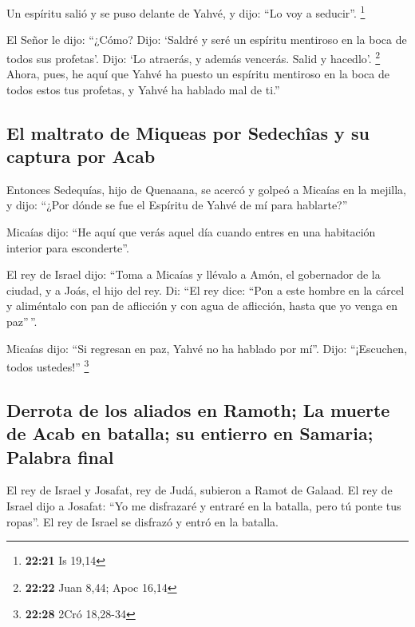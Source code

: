 \begin{paracol}{2}
 Un espíritu salió y se puso delante de Yahvé, y dijo:
``Lo voy a seducir''. \footnote{\textbf{22:21} Is 19,14}

 El Señor le dijo: ``¿Cómo? Dijo: `Saldré y seré un
espíritu mentiroso en la boca de todos sus profetas'. Dijo: `Lo
atraerás, y además vencerás. Salid y hacedlo'. \footnote{\textbf{22:22}
  Juan 8,44; Apoc 16,14}  Ahora, pues, he aquí que Yahvé
ha puesto un espíritu mentiroso en la boca de todos estos tus profetas,
y Yahvé ha hablado mal de ti.''

\hypertarget{el-maltrato-de-miqueas-por-sedechuxeeas-y-su-captura-por-acab}{%
\subsection{El maltrato de Miqueas por Sedechîas y su captura por
Acab}\label{el-maltrato-de-miqueas-por-sedechuxeeas-y-su-captura-por-acab}}

 Entonces Sedequías, hijo de Quenaana, se acercó y golpeó
a Micaías en la mejilla, y dijo: ``¿Por dónde se fue el Espíritu de
Yahvé de mí para hablarte?''

 Micaías dijo: ``He aquí que verás aquel día cuando
entres en una habitación interior para esconderte''.

 El rey de Israel dijo: ``Toma a Micaías y llévalo a
Amón, el gobernador de la ciudad, y a Joás, el hijo del rey.
 Di: ``El rey dice: ``Pon a este hombre en la cárcel y
aliméntalo con pan de aflicción y con agua de aflicción, hasta que yo
venga en paz''\,''.

 Micaías dijo: ``Si regresan en paz, Yahvé no ha hablado
por mí''. Dijo: ``¡Escuchen, todos ustedes!'' \footnote{\textbf{22:28}
  2Cró 18,28-34}

\hypertarget{derrota-de-los-aliados-en-ramoth-la-muerte-de-acab-en-batalla-su-entierro-en-samaria-palabra-final}{%
\subsection{Derrota de los aliados en Ramoth; La muerte de Acab en
batalla; su entierro en Samaria; Palabra
final}\label{derrota-de-los-aliados-en-ramoth-la-muerte-de-acab-en-batalla-su-entierro-en-samaria-palabra-final}}

 El rey de Israel y Josafat, rey de Judá, subieron a
Ramot de Galaad.  El rey de Israel dijo a Josafat: ``Yo
me disfrazaré y entraré en la batalla, pero tú ponte tus ropas''. El rey
de Israel se disfrazó y entró en la batalla.


\end{paracol}
